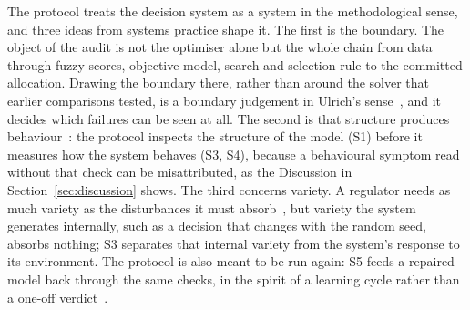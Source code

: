 \documentclass[systems,article,submit,moreauthors,pdftex]{Definitions/mdpi}
\begin{document}
The protocol treats the decision system as a system in the methodological sense, and three
ideas from systems practice shape it. The first is the boundary. The object of the audit is
not the optimiser alone but the whole chain from data through fuzzy scores, objective model,
search and selection rule to the committed allocation. Drawing the boundary there, rather
than around the solver that earlier comparisons tested, is a boundary judgement in Ulrich's
sense~\cite{ulrich1987critical}, and it decides which failures can be seen at all. The second
is that structure produces behaviour~\cite{sterman2002allmodels}: the protocol inspects the
structure of the model (S1) before it measures how the system behaves (S3, S4), because a
behavioural symptom read without that check can be misattributed, as the
Discussion in Section~\ref{sec:discussion} shows. The third concerns variety. A regulator needs as much variety
as the disturbances it must absorb~\cite{ashby1956cybernetics}, but variety the system
generates internally, such as a decision that changes with the random seed, absorbs nothing;
S3 separates that internal variety from the system's response to its environment. The
protocol is also meant to be run again: S5 feeds a repaired model back through the same
checks, in the spirit of a learning cycle rather than a one-off verdict~\cite{checkland2000ssm}.
\end{document}
